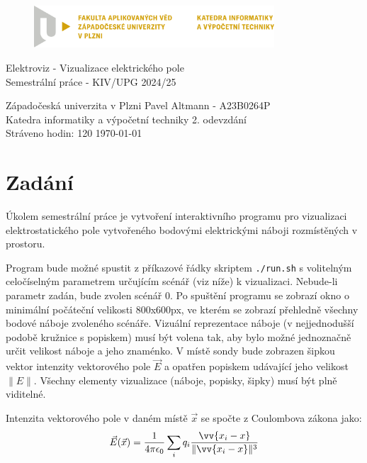 \documentclass[12pt,a4paper]{article}
\newcommand{\code}[1]{\texttt{#1}}
\begin{document}
\begin{figure}[H]
	\centering
	\includegraphics[width=0.8\textwidth]{pic/kiv-cmyk-cz}
\end{figure}

\begin{center}
	\vspace{.5cm}
	\LARGE{Elektroviz - Vizualizace elektrického pole}\\
	\large{Semestrální práce - KIV/UPG 2024/25}
\end{center}

\vfill

\noindent
Západočeská univerzita v Plzni \hfill Pavel Altmann - A23B0264P\\
Katedra informatiky a výpočetní techniky \hfill 2. odevzdání\\
Stráveno hodin: 120 \hfill \today
\thispagestyle{empty}

\newpage
\setcounter{page}{1}

\tableofcontents

\newpage

\section{Zadání}

Úkolem semestrální práce je vytvoření interaktivního programu pro vizualizaci
elektrostatického pole vytvořeného bodovými elektrickými náboji rozmístěných v
prostoru.

Program bude možné spustit z příkazové řádky skriptem \code{./run.sh} s
volitelným celočíselným parametrem určujícím scénář (viz níže) k vizualizaci.
Nebude-li parametr zadán, bude zvolen scénář 0. Po spuštění programu se zobrazí
okno o minimální počáteční velikosti 800x600px, ve kterém se zobrazí přehledně
všechny bodové náboje zvoleného scénáře. Vizuální reprezentace náboje (v
nejjednodušší podobě kružnice s popiskem) musí být volena tak, aby bylo možné
jednoznačně určit velikost náboje a jeho znaménko. V místě sondy bude zobrazen
šipkou vektor intenzity vektorového pole $\vec{E}$ a opatřen popiskem udávající jeho
velikost $\|E\|$. Všechny elementy vizualizace (náboje, popisky, šipky) musí být
plně viditelné.

Intenzita vektorového pole v daném místě $\vec{x}$ se spočte
z Coulombova zákona jako:
\[ \vec{E}(\vec{x}) = \frac{1}{4 \pi \epsilon_0}
\sum_i q_i \frac{\vv{x_i - x}}{\|\vv{x_i - x}\|^3} \]
\end{document}

